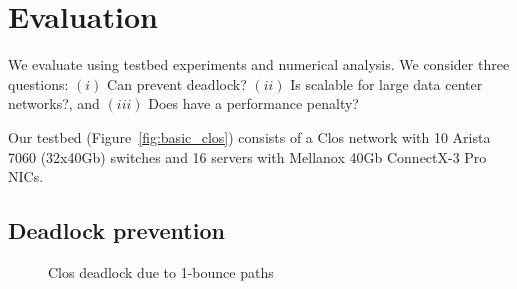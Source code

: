 \section{Evaluation}\label{sec:eval}

We evaluate \sysname{} using testbed experiments and numerical analysis.  We
consider three questions: $(i)$ Can \sysname{} prevent deadlock?  $(ii)$ Is
\sysname{} scalable for large data center networks?, and $(iii)$ Does \sysname{}
have a performance penalty?


 Our testbed (Figure~\ref{fig:basic_clos}) consists of a Clos
network with 10 Arista 7060 (32x40Gb) switches and 16 servers with Mellanox 40Gb
ConnectX-3 Pro NICs.  

\subsection{Deadlock prevention}\label{subsec:exp_validation}

\begin{figure}[t]
	\centering
	
	\vspace{-1em}
	\caption{Clos deadlock due to 1-bounce paths}\label{fig:exp_validation_nonloop}
	\vspace{-0.3in}
\end{figure}

